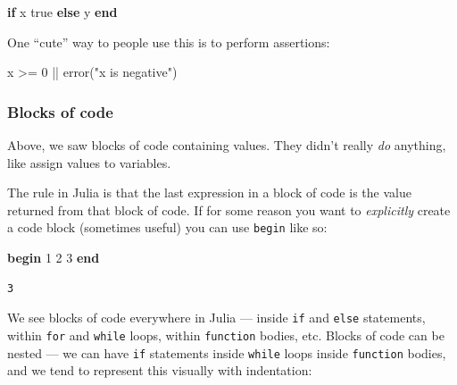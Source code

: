 \documentclass[
]{article}
\newenvironment{Shaded}{\begin{snugshade}}{\end{snugshade}}
\newcommand{\ConstantTok}[1]{\textcolor[rgb]{0.56,0.35,0.01}{#1}}
\newcommand{\ControlFlowTok}[1]{\textcolor[rgb]{0.00,0.23,0.31}{\textbf{#1}}}
\newcommand{\FloatTok}[1]{\textcolor[rgb]{0.68,0.00,0.00}{#1}}
\newcommand{\FunctionTok}[1]{\textcolor[rgb]{0.28,0.35,0.67}{#1}}
\newcommand{\NormalTok}[1]{\textcolor[rgb]{0.00,0.23,0.31}{#1}}
\newcommand{\OperatorTok}[1]{\textcolor[rgb]{0.37,0.37,0.37}{#1}}
\newcommand{\StringTok}[1]{\textcolor[rgb]{0.13,0.47,0.30}{#1}}
\begin{document}
\begin{Shaded}
\begin{Highlighting}[]
\ControlFlowTok{if}\NormalTok{ x}
   \ConstantTok{true}
\ControlFlowTok{else}
\NormalTok{   y}
\ControlFlowTok{end}
\end{Highlighting}
\end{Shaded}

One ``cute'' way to people use this is to perform assertions:

\begin{Shaded}
\begin{Highlighting}[]
\NormalTok{x }\OperatorTok{\textgreater{}=} \FloatTok{0} \OperatorTok{||} \FunctionTok{error}\NormalTok{(}\StringTok{"x is negative"}\NormalTok{)}
\end{Highlighting}
\end{Shaded}

\subsubsection{Blocks of code}\label{blocks-of-code}

Above, we saw blocks of code containing values. They didn't really
\emph{do} anything, like assign values to variables.

The rule in Julia is that the last expression in a block of code is the
value returned from that block of code. If for some reason you want to
\emph{explicitly} create a code block (sometimes useful) you can use
\texttt{begin} like so:

\begin{Shaded}
\begin{Highlighting}[]
\ControlFlowTok{begin}
   \FloatTok{1}
   \FloatTok{2}
   \FloatTok{3}
\ControlFlowTok{end}
\end{Highlighting}
\end{Shaded}

\begin{verbatim}
3
\end{verbatim}

We see blocks of code everywhere in Julia --- inside \texttt{if} and
\texttt{else} statements, within \texttt{for} and \texttt{while} loops,
within \texttt{function} bodies, etc. Blocks of code can be nested ---
we can have \texttt{if} statements inside \texttt{while} loops inside
\texttt{function} bodies, and we tend to represent this visually with
indentation:
\end{document}
